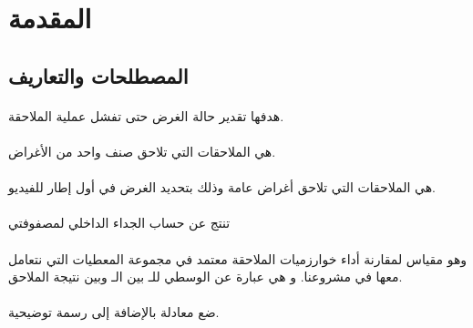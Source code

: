 \documentclass[a4paper,1  pt]{report}
\title{\textRL{الملاحقة بالاعتماد على تقنيات التعلم العميق}}
\author{مي عبود}
\begin{document}
\maketitle
\tableofcontents


\chapter{المقدمة}
\section{المصطلحات والتعاريف}
 
\subsubsection{}

\subsubsection{}
 هدفها تقدير حالة الغرض حتى تفشل عملية الملاحقة.
\subsubsection{}
  هي الملاحقات التي تلاحق صنف واحد من الأغراض.
\subsubsection{}
هي الملاحقات التي تلاحق أغراض عامة وذلك بتحديد الغرض في أول إطار للفيديو.
\subsubsection{}
تنتج عن حساب الجداء الداخلي لمصفوفتي

\subsubsection{}
وهو مقياس لمقارنة أداء خوارزميات الملاحقة معتمد في مجموعة المعطيات
التي نتعامل معها في مشروعنا. و هي عبارة عن الوسطي للـ
بين الـ 
وبين نتيجة الملاحق.
\subsubsection{}
ضع معادلة 
 بالإضافة إلى رسمة توضيحية.
\end{document}
